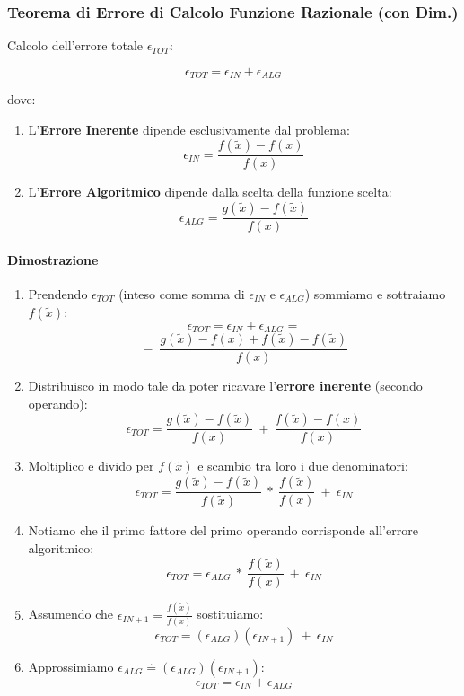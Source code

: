 \documentclass{article}
\begin{document}
\subsubsection{Teorema di Errore di Calcolo Funzione Razionale (con Dim.)}

Calcolo dell'errore totale $\epsilon_{TOT}$:

\[ \boxed{\epsilon_{TOT} = \epsilon_{IN} + \epsilon_{ALG}} \]

dove:

\begin{enumerate}
    \item L'\textbf{Errore Inerente} dipende esclusivamente dal problema:
    \[ \boxed{\epsilon_{IN} = \frac{f(\tilde{x}) - f(x)}{f(x)}} \]
    \item L'\textbf{Errore Algoritmico} dipende dalla scelta della funzione scelta:
    \[ \boxed{\epsilon_{ALG} = \frac{g(\tilde{x}) - f(\tilde{x})}{f(x)}} \]
\end{enumerate}

\paragraph{Dimostrazione}

\begin{enumerate}
    \item Prendendo $\epsilon_{TOT}$ (inteso come somma di $\epsilon_{IN}$ e $\epsilon_{ALG}$) sommiamo e sottraiamo $f(\tilde{x})$:
    \[ \epsilon_{TOT} = \epsilon_{IN} + \epsilon_{ALG} =\]
    \[ = \: \frac{g(\tilde{x})-f(x)+f(\tilde{x})-f(\tilde{x})}{f(x)} \]
    \item Distribuisco in modo tale da poter ricavare l'\textbf{errore inerente} (secondo operando):
    \[ \epsilon_{TOT} = \frac{g(\tilde{x})-f(\tilde{x})}{f(x)} \: + \: \frac{f(\tilde{x})-f(x)}{f(x)}  \]
    \item Moltiplico e divido per $f(\tilde{x})$ e scambio tra loro i due denominatori:
    \[ \epsilon_{TOT} = \frac{g(\tilde{x})-f(\tilde{x})}{f(\tilde{x})} \: * \: \frac{f(\tilde{x})}{f(x)}\:+\:\epsilon_{IN}  \]
    \item Notiamo che il primo fattore del primo operando corrisponde all'errore algoritmico:
    \[ \epsilon_{TOT} = \epsilon_{ALG} \: * \: \frac{f(\tilde{x})}{f(x)}\:+\:\epsilon_{IN}  \]
    \item Assumendo che $\epsilon_{IN+1} = \frac{f(\tilde{x})}{f(x)}$ sostituiamo:
    \[ \epsilon_{TOT} = (\epsilon_{ALG})(\epsilon_{IN+1})\:+\:\epsilon_{IN}  \]
    \item Approssimiamo $\epsilon_{ALG} \doteq (\epsilon_{ALG})(\epsilon_{IN+1})$:
    \[ \boxed{\epsilon_{TOT} = \epsilon_{IN} + \epsilon_{ALG}} \]
    
\end{enumerate}
\end{document}
